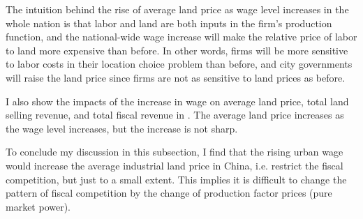 The intuition behind the rise of average land price as wage level increases in the whole nation is
that labor and land are both inputs in the firm's production function,
and the national-wide wage increase will make the relative price of labor to land
more expensive than before. In other words,
firms will be more sensitive to labor costs in their location choice problem than before, and
city governments will raise the land price since firms are not as sensitive to land prices as before.

I also show the impacts of the increase in wage on average land price, total land selling revenue,
and total fiscal revenue in .
The average land price increases as the wage level increases, but the increase is not sharp.




To conclude my discussion in this subsection, I find that the rising urban wage would
increase the average industrial land price in China, i.e. restrict the fiscal
competition, but just to a small extent. This implies it is difficult to change
the pattern of fiscal competition by the change of production factor prices (pure market power).















